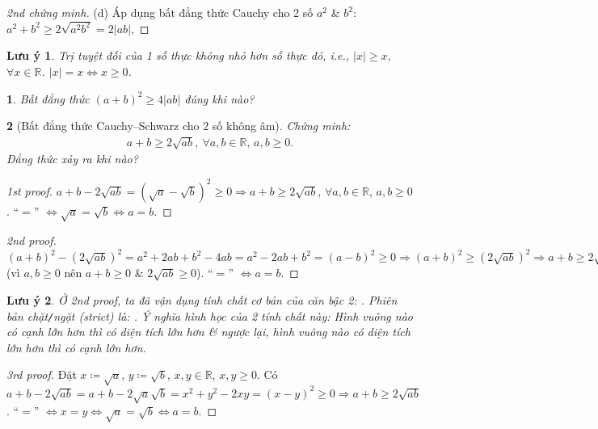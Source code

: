 \documentclass{article}
\newtheorem{baitoan}{}
\newtheorem{luuy}{Lưu ý}
\begin{document}
\begin{proof}[2nd chứng minh]
	(d) Áp dụng bất đẳng thức Cauchy cho 2 số $a^2$ \& $b^2$: $a^2 + b^2\ge2\sqrt{a^2b^2} = 2|ab|$, 
\end{proof}

\begin{luuy}
	Trị tuyệt đối của 1 số thực không nhỏ hơn số thực đó, i.e., $|x|\ge x$, $\forall x\in\mathbb{R}$. $|x| = x\Leftrightarrow x\ge0$.
\end{luuy}

\begin{baitoan}
	Bất đẳng thức $(a + b)^2\ge4|ab|$ đúng khi nào?
\end{baitoan}

\begin{baitoan}[Bất đẳng thức Cauchy--Schwarz cho 2 số không âm]
	Chứng minh:
	\begin{align*}
		\boxed{a + b\ge2\sqrt{ab},\ \forall a,b\in\mathbb{R},\,a,b\ge 0.}
	\end{align*}
	Đẳng thức xảy ra khi nào?
\end{baitoan}

\begin{proof}[1st proof]
	$a + b - 2\sqrt{ab} = (\sqrt{a} - \sqrt{b})^2\ge0\Rightarrow a + b\ge2\sqrt{ab}$, $\forall a,b\in\mathbb{R}$, $a,b\ge 0$. ``$=$'' $\Leftrightarrow\sqrt{a} = \sqrt{b}\Leftrightarrow a = b$.
\end{proof}

\begin{proof}[2nd proof]
	$(a + b)^2 - (2\sqrt{ab})^2 = a^2 + 2ab + b^2 - 4ab = a^2 - 2ab + b^2 = (a - b)^2\ge0\Rightarrow(a + b)^2\ge(2\sqrt{ab})^2\Rightarrow a + b\ge2\sqrt{ab}$ (vì $a,b\ge0$ nên $a + b\ge0$ \& $2\sqrt{ab}\ge0$). ``$=$'' $\Leftrightarrow a = b$.
\end{proof}

\begin{luuy}
	Ở 2nd proof, ta đã vận dụng tính chất cơ bản của căn bậc 2: . Phiên bản chặt\emph{\texttt{/}}ngặt (strict) là: . Ý nghĩa hình học của 2 tính chất này: Hình vuông nào có cạnh lớn hơn thì có diện tích lớn hơn \& ngược lại, hình vuông nào có diện tích lớn hơn thì có cạnh lớn hơn.
\end{luuy}

\begin{proof}[3rd proof]
	Đặt $x\coloneqq\sqrt{a}$, $y\coloneqq\sqrt{b}$, $x,y\in\mathbb{R}$, $x,y\ge0$. Có $a + b - 2\sqrt{ab} = a + b - 2\sqrt{a}\sqrt{b} = x^2 + y^2 - 2xy = (x - y)^2\ge0\Rightarrow a + b\ge2\sqrt{ab}$. ``$=$'' $\Leftrightarrow x = y\Leftrightarrow\sqrt{a} = \sqrt{b}\Leftrightarrow a = b$.
\end{proof}
\end{document}
